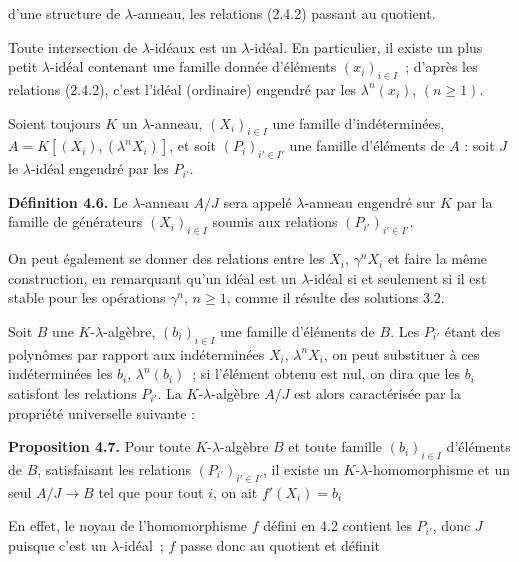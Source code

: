 d'une
structure de \(\lambda\)-anneau, les relations (2.4.2) passant au quotient.

Toute intersection de \(\lambda\)-idéaux est un \(\lambda\)-idéal. En particulier, il existe un plus petit \(\lambda\)-idéal contenant une famille donnée d'éléments \((x_i)_{i\in I}\)~; d'après les relations (2.4.2), c'est l'idéal (ordinaire) engendré par les \(\lambda^n(x_i)\), \((n\ge1)\).

Soient toujours \(K\) un \(\lambda\)-anneau, \((X_i)_{i\in I}\) une famille d'indéterminées, \(A=K[(X_i),(\lambda^n X_i)]\), et soit \((P_i)_{i'\in I'}\) une famille d'éléments de \(A\) : soit \(J\) le \(\lambda\)-idéal engendré par les \(P_{i'}\).

\textbf{Définition 4.6.} Le \(\lambda\)-anneau \(A/J\) sera appelé \(\lambda\)-anneau engendré sur \(K\) par la famille de générateurs \((X_i)_{i\in I}\) soumis aux relations \((P_{i'})_{i'\in I'}\).

On peut également se donner des relations entre les \(X_i\), \(\gamma^n X_i\) et faire la même construction, en remarquant qu'un idéal est un \(\lambda\)-idéal si et seulement si il est stable pour les opérations \(\gamma^n\), \(n\ge1\), comme il résulte des solutions 3.2.

Soit \(B\) une \(K\)-\(\lambda\)-algèbre, \((b_i)_{i\in I}\) une famille d'éléments de \(B\). Les \(P_{i'}\) étant des polynômes par rapport aux indéterminées \(X_i\), \(\lambda^n X_i\), on peut substituer à ces indéterminées les \(b_i\), \(\lambda^n(b_i)\)~; si l'élément obtenu est nul, on dira que les \(b_i\) satisfont les relations \(P_{i'}\). La \(K\)-\(\lambda\)-algèbre \(A/J\) est alors caractérisée par la propriété universelle suivante :

\textbf{Proposition 4.7.} Pour toute \(K\)-\(\lambda\)-algèbre \(B\) et toute famille \((b_i)_{i\in I}\) d'éléments de \(B\), satisfaisant les relations \((P_{i'})_{i'\in I'}\), il existe un \(K\)-\(\lambda\)-homomorphisme et un seul \(A/J\to B\) tel que pour tout \(i\), on ait \(f'(X_i)=b_i\)

En effet, le noyau de l'homomorphisme \(f\) défini en 4.2 contient les \(P_{i'}\), donc \(J\) puisque c'est un \(\lambda\)-idéal~; \(f\) passe donc au quotient et définit 

